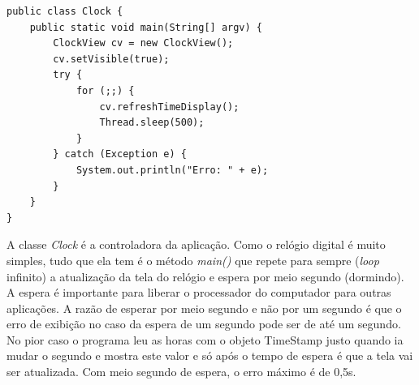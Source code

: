 \documentclass[
	article,			%
	12pt,				%
	openright,
	twoside,			%
	a4paper,			%
	english,			%
	french,
	brazil,				%
	sumario=tradicional
	]{abntex2}
\begin{document}
\begin{verbatim}
public class Clock {
    public static void main(String[] argv) {
        ClockView cv = new ClockView();
        cv.setVisible(true);
        try {
            for (;;) {
                cv.refreshTimeDisplay();
                Thread.sleep(500);
            }
        } catch (Exception e) {
            System.out.println("Erro: " + e);
        }
    }
}
\end{verbatim}

A classe \emph{Clock} é a controladora da aplicação. Como o relógio digital é muito simples, tudo que ela tem é o método \emph{main()} que repete para sempre (\emph{loop} infinito) a atualização da tela do relógio e espera por meio segundo (dormindo). A espera é importante para liberar o processador do computador para outras aplicações. A razão de esperar por meio segundo e não por um segundo é que o erro de exibição no caso da espera de um segundo pode ser de até um segundo. No pior caso o programa leu as horas com o objeto TimeStamp justo quando ia mudar o segundo e mostra este valor e só após o tempo de espera é que a tela vai ser atualizada. Com meio segundo de espera, o erro máximo é de 0,5s.

% 

%
%
%

\postextual



%
%
% 



\
\end{document}
